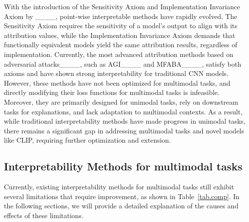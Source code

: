 With the introduction of the Sensitivity Axiom and Implementation Invariance Axiom by ____, point-wise interpretable methods have rapidly evolved. The Sensitivity Axiom requires the sensitivity of a model's output to align with its attribution values, while the Implementation Invariance Axiom demands that functionally equivalent models yield the same attribution results, regardless of implementation. Currently, the most advanced attribution methods based on adversarial attacks____, such as AGI____ and MFABA____, satisfy both axioms and have shown strong interpretability for traditional CNN models. However, these methods have not been optimized for multimodal tasks, and directly modifying their loss functions for multimodal tasks is infeasible. Moreover, they are primarily designed for unimodal tasks, rely on downstream tasks for explanations, and lack adaptation to multimodal contexts. As a result, while traditional interpretability methods have made progress in unimodal tasks, there remains a significant gap in addressing multimodal tasks and novel models like CLIP, requiring further optimization and extension.

\subsection{Interpretability Methods for multimodal tasks}
Currently, existing interpretability methods for multimodal tasks still exhibit several limitations that require improvement, as shown in Table~\ref{tab.comp}. In the following sections, we will provide a detailed explanation of the causes and effects of these limitations.

